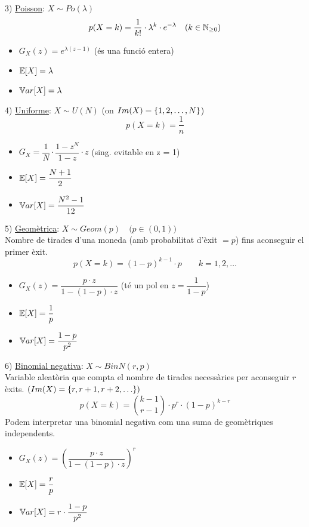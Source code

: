 \vspace{0.5cm}

3) \underline{Poisson}: $X \sim Po(\lambda)$
\[
  p(X=k) = \frac{1}{k!}\cdot \lambda^{k}\cdot e^{-\lambda} \quad (k\in \mathbb{N}_{\geq 0})
\]
\begin{itemize}
    \item $G_{X}(z) = e^{\lambda(z-1)}$ \quad (és una funció entera)
    \item $\mathbb{E}[X] = \lambda$
    \item $\mathbb{V} ar[X] = \lambda$
\end{itemize}

\vspace{0.5cm}

4) \underline{Uniforme}: $X\sim U(N)$ \quad (on $Im(X) = \left\{1,2,\ldots, N\right\}$) \\
\[
  p(X=k) = \frac{1}{n}
\]
\begin{itemize}
    \item $G_{X} = \dfrac{1}{N}\cdot \dfrac{1-z^{N}}{1-z}\cdot z$ \quad (sing. evitable en z = 1)
    \item $\mathbb{E}[X]=\dfrac{N+1}{2}$
    \item $\mathbb{V} ar[X] = \dfrac{N^{2}-1}{12}$
\end{itemize}

\newpage

5) \underline{Geomètrica}: $X\sim Geom(p) \quad \big(p\in(0,1)\big)$ \\
Nombre de tirades d'una moneda (amb probabilitat d'èxit $= p$) fins aconseguir el primer èxit.
\[
  p(X=k) = (1-p)^{k-1}\cdot p \qquad k = 1,2,\ldots
\]
\begin{itemize}
    \item $G_{X}(z) = \dfrac{p\cdot z}{1-(1-p)\cdot z}$ \quad (té un pol en $z=\dfrac{1}{1-p}$)
    \item $\mathbb{E}[X] = \dfrac{1}{p}$
    \item $\mathbb{V} ar[X] = \dfrac{1-p}{p^{2}}$
\end{itemize}

\vspace{0.5cm}

6) \underline{Binomial negativa}: $X\sim BinN(r, p)$ \\
Variable aleatòria que compta el nombre de tirades necessàries per aconseguir $r$ èxits. $\left(Im(X)=\left\{r,r+1,r+2, \ldots\right\}\right)$
\[
  p(X=k) = \binom{k-1}{r-1}\cdot p^{r}\cdot(1-p)^{k-r}
\]
Podem interpretar una binomial negativa com una suma de geomètriques independents.
\begin{itemize}
    \item $G_{X}(z) = \left( \dfrac{p\cdot z}{1-(1-p)\cdot z} \right)^{r}$
    \item $\mathbb{E}[X] = \dfrac{r}{p}$
    \item $\mathbb{V} ar[X] = r\cdot \dfrac{1-p}{p^2}$
\end{itemize}

